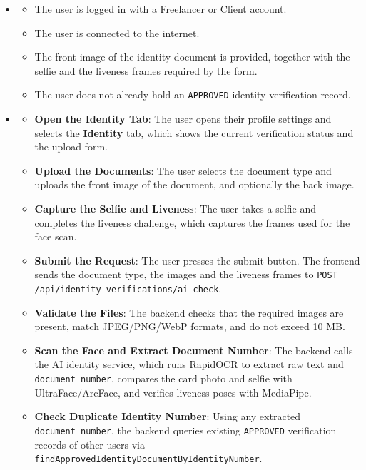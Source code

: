 \begin{itemize}[leftmargin=1.6em,topsep=4pt,itemsep=3pt,parsep=0pt,label=$\bullet$]
    \item {}
        \begin{itemize}[leftmargin=2.2em,topsep=2pt,itemsep=3pt,parsep=0pt,label=$\circ$]
            \item The user is logged in with a Freelancer or Client account.
            \item The user is connected to the internet.
            \item The front image of the identity document is provided, together with the selfie and the liveness frames required by the form.
            \item The user does not already hold an \texttt{APPROVED} identity verification record.
        \end{itemize}
    \item {}
        \begin{itemize}[leftmargin=2.2em,topsep=2pt,itemsep=3pt,parsep=0pt,label=$\circ$]
            \item \textbf{Open the Identity Tab}: The user opens their profile settings and selects the \textbf{Identity} tab, which shows the current verification status and the upload form.
            \item \textbf{Upload the Documents}: The user selects the document type and uploads the front image of the document, and optionally the back image.
            \item \textbf{Capture the Selfie and Liveness}: The user takes a selfie and completes the liveness challenge, which captures the frames used for the face scan.
            \item \textbf{Submit the Request}: The user presses the submit button. The frontend sends the document type, the images and the liveness frames to \texttt{POST /api/identity-verifications/ai-check}.
            \item \textbf{Validate the Files}: The backend checks that the required images are present, match JPEG/PNG/WebP formats, and do not exceed 10 MB.
            \item \textbf{Scan the Face and Extract Document Number}: The backend calls the AI identity service, which runs RapidOCR to extract raw text and \texttt{document\_number}, compares the card photo and selfie with UltraFace/ArcFace, and verifies liveness poses with MediaPipe.
            \item \textbf{Check Duplicate Identity Number}: Using any extracted \texttt{document\_number}, the backend queries existing \texttt{APPROVED} verification records of other users via \texttt{findApprovedIdentityDocumentByIdentityNumber}.

\end{itemize}
\end{itemize}
